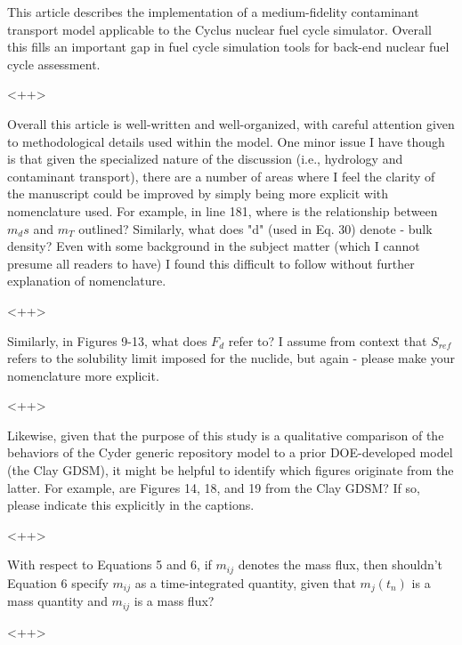 \documentclass[answers,12pt]{exam}
\begin{document}
\begin{questions}
\question This article describes the implementation of a medium-fidelity contaminant transport model applicable to the Cyclus nuclear fuel cycle simulator. Overall this fills an important gap in fuel cycle simulation tools for back-end nuclear fuel cycle assessment.
\begin{solution}
<++>
\end{solution}

\question Overall this article is well-written and well-organized, with careful attention given to methodological details used within the model. One minor issue I have though is that given the specialized nature of the discussion (i.e., hydrology and contaminant transport), there are a number of areas where I feel the clarity of the manuscript could be improved by simply being more explicit with nomenclature used. For example, in line 181, where is the relationship between $m_ds$ and $m_T$ outlined? Similarly, what does "d" (used in Eq. 30) denote - bulk density? Even with some background in the subject matter (which I cannot presume all readers to have) I found this difficult to follow without further explanation of nomenclature.
\begin{solution}
<++>
\end{solution}

\question Similarly, in Figures 9-13, what does $F_d$ refer to? I assume from 
context that $S_{ref}$ refers to the solubility limit imposed for the nuclide, but again - please make your nomenclature more explicit. 
\begin{solution}
<++>
\end{solution}

\question Likewise, given that the purpose of this study is a qualitative comparison of the behaviors of the Cyder generic repository model to a prior DOE-developed model (the Clay GDSM), it might be helpful to identify which figures originate from the latter. For example, are Figures 14, 18, and 19 from the Clay GDSM? If so, please indicate this explicitly in the captions. 
\begin{solution}
<++>
\end{solution}

\question With respect to Equations 5 and 6, if $m_{ij}$ denotes the mass flux, 
then shouldn't Equation 6 specify $m_{ij}$ as a time-integrated quantity, given 
that $m_j(t_n)$ is a mass quantity and $m_{ij}$ is a mass flux?
\begin{solution}
<++>
\end{solution}


\end{questions}
\end{document}
